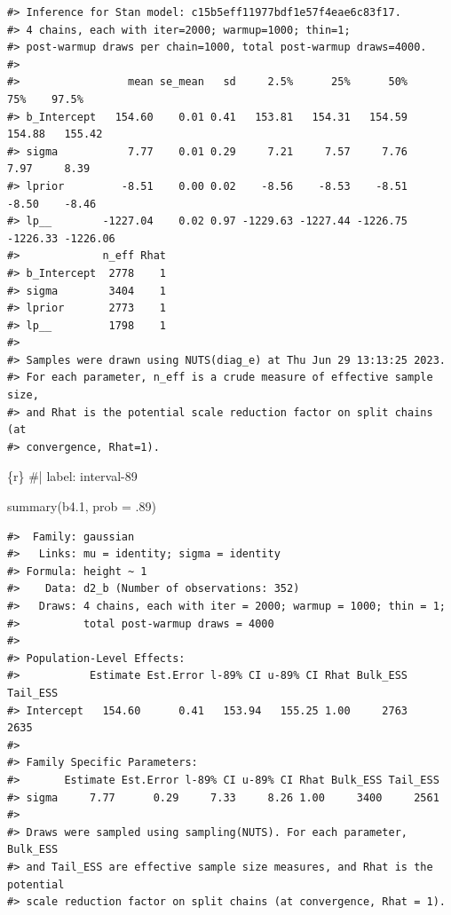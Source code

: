 \documentclass[
  letterpaper,
  DIV=11,
  numbers=noendperiod]{scrreprt}
\newenvironment{Shaded}{\begin{snugshade}}{\end{snugshade}}
\newcommand{\AttributeTok}[1]{\textcolor[rgb]{0.40,0.45,0.13}{#1}}
\newcommand{\CommentTok}[1]{\textcolor[rgb]{0.37,0.37,0.37}{#1}}
\newcommand{\DecValTok}[1]{\textcolor[rgb]{0.68,0.00,0.00}{#1}}
\newcommand{\FloatTok}[1]{\textcolor[rgb]{0.68,0.00,0.00}{#1}}
\newcommand{\FunctionTok}[1]{\textcolor[rgb]{0.28,0.35,0.67}{#1}}
\newcommand{\InformationTok}[1]{\textcolor[rgb]{0.37,0.37,0.37}{#1}}
\newcommand{\NormalTok}[1]{\textcolor[rgb]{0.00,0.23,0.31}{#1}}
\begin{document}
\begin{verbatim}
#> Inference for Stan model: c15b5eff11977bdf1e57f4eae6c83f17.
#> 4 chains, each with iter=2000; warmup=1000; thin=1; 
#> post-warmup draws per chain=1000, total post-warmup draws=4000.
#> 
#>                 mean se_mean   sd     2.5%      25%      50%      75%    97.5%
#> b_Intercept   154.60    0.01 0.41   153.81   154.31   154.59   154.88   155.42
#> sigma           7.77    0.01 0.29     7.21     7.57     7.76     7.97     8.39
#> lprior         -8.51    0.00 0.02    -8.56    -8.53    -8.51    -8.50    -8.46
#> lp__        -1227.04    0.02 0.97 -1229.63 -1227.44 -1226.75 -1226.33 -1226.06
#>             n_eff Rhat
#> b_Intercept  2778    1
#> sigma        3404    1
#> lprior       2773    1
#> lp__         1798    1
#> 
#> Samples were drawn using NUTS(diag_e) at Thu Jun 29 13:13:25 2023.
#> For each parameter, n_eff is a crude measure of effective sample size,
#> and Rhat is the potential scale reduction factor on split chains (at 
#> convergence, Rhat=1).
\end{verbatim}

\begin{Shaded}
\begin{Highlighting}[]
\InformationTok{\textasciigrave{}\textasciigrave{}\textasciigrave{}\{r\}}
\CommentTok{\#| label: interval{-}89}

\FunctionTok{summary}\NormalTok{(b4}\FloatTok{.1}\NormalTok{, }\AttributeTok{prob =}\NormalTok{ .}\DecValTok{89}\NormalTok{)}
\InformationTok{\textasciigrave{}\textasciigrave{}\textasciigrave{}}
\end{Highlighting}
\end{Shaded}

\begin{verbatim}
#>  Family: gaussian 
#>   Links: mu = identity; sigma = identity 
#> Formula: height ~ 1 
#>    Data: d2_b (Number of observations: 352) 
#>   Draws: 4 chains, each with iter = 2000; warmup = 1000; thin = 1;
#>          total post-warmup draws = 4000
#> 
#> Population-Level Effects: 
#>           Estimate Est.Error l-89% CI u-89% CI Rhat Bulk_ESS Tail_ESS
#> Intercept   154.60      0.41   153.94   155.25 1.00     2763     2635
#> 
#> Family Specific Parameters: 
#>       Estimate Est.Error l-89% CI u-89% CI Rhat Bulk_ESS Tail_ESS
#> sigma     7.77      0.29     7.33     8.26 1.00     3400     2561
#> 
#> Draws were sampled using sampling(NUTS). For each parameter, Bulk_ESS
#> and Tail_ESS are effective sample size measures, and Rhat is the potential
#> scale reduction factor on split chains (at convergence, Rhat = 1).
\end{verbatim}
\end{document}
